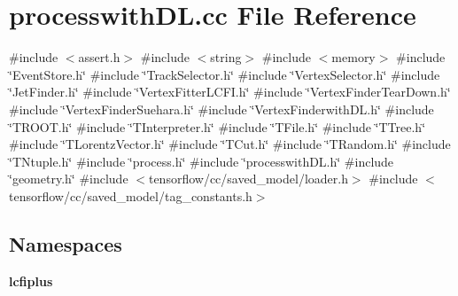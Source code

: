 \section{processwith\+D\+L.\+cc File Reference}
\label{processwithDL_8cc}
{\ttfamily \#include $<$assert.\+h$>$}\newline
{\ttfamily \#include $<$string$>$}\newline
{\ttfamily \#include $<$memory$>$}\newline
{\ttfamily \#include \char`\"{}Event\+Store.\+h\char`\"{}}\newline
{\ttfamily \#include \char`\"{}Track\+Selector.\+h\char`\"{}}\newline
{\ttfamily \#include \char`\"{}Vertex\+Selector.\+h\char`\"{}}\newline
{\ttfamily \#include \char`\"{}Jet\+Finder.\+h\char`\"{}}\newline
{\ttfamily \#include \char`\"{}Vertex\+Fitter\+L\+C\+F\+I.\+h\char`\"{}}\newline
{\ttfamily \#include \char`\"{}Vertex\+Finder\+Tear\+Down.\+h\char`\"{}}\newline
{\ttfamily \#include \char`\"{}Vertex\+Finder\+Suehara.\+h\char`\"{}}\newline
{\ttfamily \#include \char`\"{}Vertex\+Finderwith\+D\+L.\+h\char`\"{}}\newline
{\ttfamily \#include \char`\"{}T\+R\+O\+O\+T.\+h\char`\"{}}\newline
{\ttfamily \#include \char`\"{}T\+Interpreter.\+h\char`\"{}}\newline
{\ttfamily \#include \char`\"{}T\+File.\+h\char`\"{}}\newline
{\ttfamily \#include \char`\"{}T\+Tree.\+h\char`\"{}}\newline
{\ttfamily \#include \char`\"{}T\+Lorentz\+Vector.\+h\char`\"{}}\newline
{\ttfamily \#include \char`\"{}T\+Cut.\+h\char`\"{}}\newline
{\ttfamily \#include \char`\"{}T\+Random.\+h\char`\"{}}\newline
{\ttfamily \#include \char`\"{}T\+Ntuple.\+h\char`\"{}}\newline
{\ttfamily \#include \char`\"{}process.\+h\char`\"{}}\newline
{\ttfamily \#include \char`\"{}processwith\+D\+L.\+h\char`\"{}}\newline
{\ttfamily \#include \char`\"{}geometry.\+h\char`\"{}}\newline
{\ttfamily \#include $<$tensorflow/cc/saved\+\_\+model/loader.\+h$>$}\newline
{\ttfamily \#include $<$tensorflow/cc/saved\+\_\+model/tag\+\_\+constants.\+h$>$}\newline
\subsection*{Namespaces}
\begin{DoxyCompactItemize}
\item 
 \textbf{ lcfiplus}
\end{DoxyCompactItemize}
